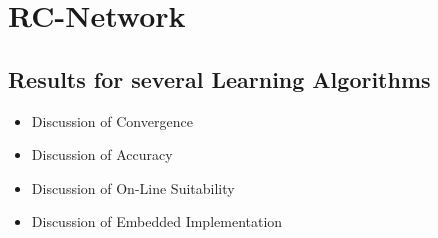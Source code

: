 \section{RC-Network}
\subsection{Results for several Learning Algorithms}
\begin{itemize}
\item{Discussion of Convergence}
\item{Discussion of Accuracy}
\item{Discussion of On-Line Suitability}
\item{Discussion of Embedded Implementation}
\end{itemize}
